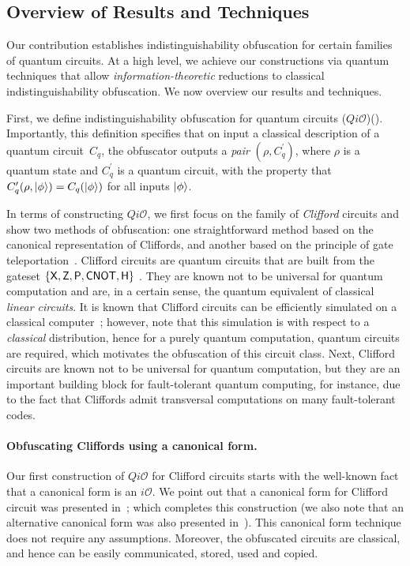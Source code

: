 \subsection{Overview of Results and Techniques}
\label{sec:techniques}

Our contribution establishes indistinguishability obfuscation for certain families of quantum circuits.  At a high level, we achieve our constructions via quantum techniques that allow \emph{information-theoretic} reductions to classical indistinguishability obfuscation. We now overview our results and techniques.

First, we define indistinguishability obfuscation for quantum circuits ($Qi\mathcal{O}$)(). Importantly, this definition specifies that on input a classical description of a quantum circuit~$C_q$, the obfuscator outputs a \emph{pair} $(\rho, C_q^\prime)$, where $\rho$ is a quantum state and $C_q^\prime$ is a quantum circuit, with the property that
$C_q^\prime(\rho,{\lvert}\phi\rangle)=C_{q}({\lvert}\phi\rangle)$ for all inputs ${\lvert}\phi\rangle$.

In terms of constructing $Qi\mathcal{O}$, we first focus on the family of \emph{Clifford} circuits and show two methods of obfuscation: one straightforward method based on the canonical representation of Cliffords, and another based on the
principle of gate teleportation~\cite{GC99}.
Clifford circuits are quantum circuits that are built from the gateset $\{{\sf X}, {\sf Z}, {\sf P}, {\sf CNOT}, {\sf H}\}$ . They are known not to be universal for quantum computation and  are, in a certain sense, the quantum equivalent of classical \emph{linear circuits}. It is known that Clifford circuits can be efficiently simulated on a classical computer~\cite{Got98}; however, note that  this simulation is with respect to a \emph{classical} distribution, hence for a purely quantum computation, quantum circuits are required, which motivates the obfuscation of this circuit class. Next,  Clifford circuits are known not to be universal for quantum computation, but they are an important building block for fault-tolerant quantum computing, for instance, due to the fact that Cliffords admit transversal computations on many fault-tolerant codes.

\paragraph{Obfuscating Cliffords using a canonical form.} Our first construction of $Qi\mathcal{O}$ for Clifford circuits starts with the well-known fact that a canonical form is an $i\mathcal{O}$. We point out that a canonical form for Clifford circuit was presented in~\cite{AG04}; which completes this construction (we also note that an alternative canonical form was also presented in~\cite{Sel13arxiv}). This canonical form technique  does not require any assumptions. Moreover, the obfuscated circuits are classical, and hence can be easily communicated, stored, used and copied.

